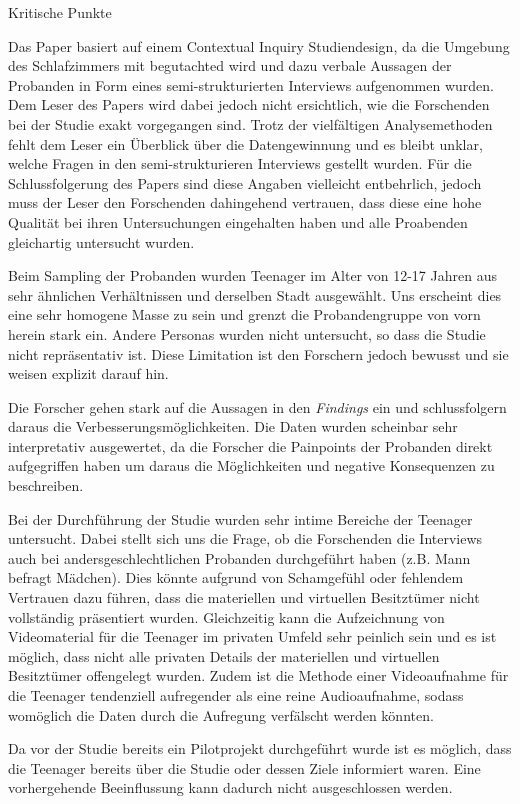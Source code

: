 \documentclass{hsflensburg}
\begin{document}
	Kritische Punkte

	Das Paper basiert auf einem Contextual Inquiry Studiendesign, da die Umgebung des Schlafzimmers mit begutachted wird und dazu verbale Aussagen der Probanden in Form eines semi-strukturierten Interviews aufgenommen wurden. Dem Leser des Papers wird dabei jedoch nicht ersichtlich, wie die Forschenden bei der Studie exakt vorgegangen sind. Trotz der vielfältigen Analysemethoden fehlt dem Leser ein Überblick über die Datengewinnung und es bleibt unklar, welche Fragen in den semi-strukturieren Interviews gestellt wurden. Für die Schlussfolgerung des Papers sind diese Angaben vielleicht entbehrlich, jedoch muss der Leser den Forschenden dahingehend vertrauen, dass diese eine hohe Qualität bei ihren Untersuchungen eingehalten haben und alle Proabenden gleichartig untersucht wurden.
	
	Beim Sampling der Probanden wurden Teenager im Alter von 12-17 Jahren aus sehr ähnlichen Verhältnissen und derselben Stadt ausgewählt. Uns erscheint dies eine sehr homogene Masse zu sein und grenzt die Probandengruppe von vorn herein stark ein. Andere Personas wurden nicht untersucht, so dass die Studie nicht repräsentativ ist. Diese Limitation ist den Forschern jedoch bewusst und sie weisen explizit darauf hin. 

	Die Forscher gehen stark auf die Aussagen in den \textit{Findings} ein und schlussfolgern daraus die Verbesserungsmöglichkeiten. Die Daten wurden scheinbar sehr interpretativ ausgewertet, da die Forscher die Painpoints der Probanden direkt aufgegriffen haben um daraus die Möglichkeiten und negative Konsequenzen zu beschreiben.

	Bei der Durchführung der Studie wurden sehr intime Bereiche der Teenager untersucht. Dabei stellt sich uns die Frage, ob die Forschenden die Interviews auch bei andersgeschlechtlichen Probanden durchgeführt haben (z.B. Mann befragt Mädchen). Dies könnte aufgrund von Schamgefühl oder fehlendem Vertrauen dazu führen, dass die materiellen und virtuellen Besitztümer nicht vollständig präsentiert wurden. Gleichzeitig kann die Aufzeichnung von Videomaterial für die Teenager im privaten Umfeld sehr peinlich sein und es ist möglich, dass nicht alle privaten Details der materiellen und virtuellen Besitztümer offengelegt wurden. Zudem ist die Methode einer Videoaufnahme für die Teenager tendenziell aufregender als eine reine Audioaufnahme, sodass womöglich die Daten durch die Aufregung verfälscht werden könnten. 

	Da vor der Studie bereits ein Pilotprojekt durchgeführt wurde ist es möglich, dass die Teenager bereits über die Studie oder dessen Ziele informiert waren. Eine vorhergehende Beeinflussung kann dadurch nicht ausgeschlossen werden. 
\end{document}
